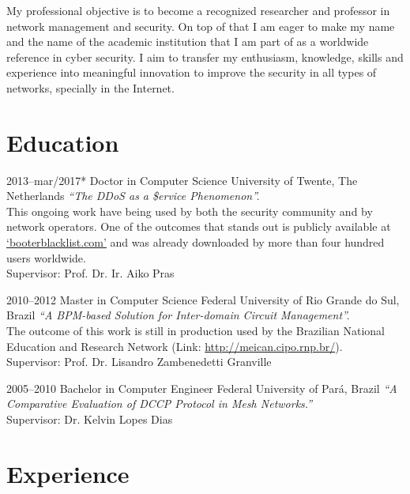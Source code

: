 \documentclass[print]{styles/friggeri-cv-mac} %
\begin{document}
\vspace{-5pt}\setlength\parindent{12pt}My professional objective is to become a
recognized researcher and professor in network management and security. On top
of that I am eager to make my name and the name of the academic institution that
I am part of as a worldwide reference in cyber security. I aim to transfer my
enthusiasm, knowledge, skills and experience into meaningful innovation to
improve the security in all types of networks, specially in the Internet. 

\setlength\parindent{0pt}
\section{Education}\vspace{-5pt}

\begin{entrylist}

\entry
{2013--mar/2017*}
{Doctor {\normalfont in Computer Science}}
{University of Twente, The Netherlands}
{\emph{``The DDoS as a \$ervice Phenomenon''.} \\
This ongoing work have being used by both the security community and by network
operators. One of the outcomes that stands out is publicly available at
\href{http://booterblacklist.com}{`booterblacklist.com'} and was already downloaded by more
than four hundred users worldwide.\\ 
Supervisor: Prof. Dr. Ir. Aiko Pras }	

\entry
{2010--2012}
{Master {\normalfont in Computer Science}}
{Federal University of Rio Grande do Sul, Brazil}
{\emph{``A BPM-based Solution for Inter-domain Circuit Management''.}\\
The outcome of this work is still in production used by the Brazilian
National Education and Research Network (Link:
\href{http://meican.cipo.rnp.br/}{http://meican.cipo.rnp.br/}).\\ 
Supervisor: Prof. Dr. Lisandro Zambenedetti Granville}

\entry
{2005--2010}
{Bachelor {\normalfont in Computer Engineer}}
{Federal University of Par\'a, Brazil}
{\emph{``A Comparative Evaluation of DCCP Protocol in Mesh Networks.''} \\ 
Supervisor: Dr. Kelvin Lopes Dias
}

\end{entrylist}

\section{Experience}\vspace{-5pt}
\end{document}
